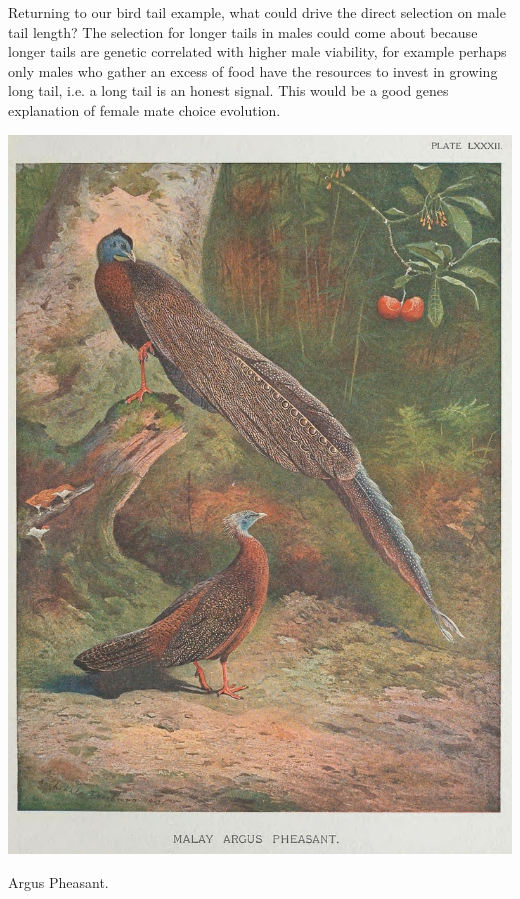 Returning to our bird tail example, what could drive the direct
selection on male tail length? The selection for longer tails in males could come about because
longer tails are genetic correlated with higher male viability, for
example perhaps only males who gather an excess of food have the
resources to invest in growing long tail, i.e. a long tail is an
honest signal. This would be a good genes explanation of female mate
choice evolution.  

\begin{marginfigure}
\begin{center}
\includegraphics[width= \textwidth]{illustration_images/Quant_gen/Argus_pheasant/Argus_pheasant_small.jpg}
\end{center}
\caption{Argus Pheasant.  } \label{fig:argus}
\end{marginfigure}

